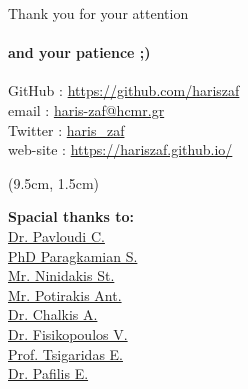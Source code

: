 \documentclass{beamer}
\begin{document}
   \begin{darkframes}
   \begin{frame}{Thank you for your attention}

      \framesubtitle{and your patience ;)}
      GitHub   : \href{https://github.com/hariszaf}{https://github.com/hariszaf} \\
      email    : \href{haris-zaf@hcmr.gr}{haris-zaf@hcmr.gr} \\
      Twitter  : \href{https://twitter.com/haris_zaf}{haris\_zaf} \\
      web-site : \url{https://hariszaf.github.io/} \\
      

      \begin{textblock*}{4.0cm}(9.5cm, 1.5cm)

         \footnotesize \textbf{Spacial thanks to:} \\

         \footnotesize \href{https://cpavloud.github.io/mysite/projects/}{Dr. Pavloudi C.} \\ 
         \footnotesize \href{https://imbbc.hcmr.gr/user/s-paragkamian/}{PhD Paragkamian S.} \\
         \footnotesize \href{https://imbbc.hcmr.gr/user/sninidakis/}{Mr. Ninidakis St.} \\
         \footnotesize \href{https://imbbc.hcmr.gr/user/potant/}{Mr. Potirakis Ant.} \\
         \footnotesize \href{https://tolischal.github.io/}{Dr. Chalkis A.} \\
         \footnotesize \href{https://vissarion.github.io/}{Dr. Fisikopoulos V.} \\ 
         \footnotesize \href{https://who.paris.inria.fr/Elias.Tsigaridas/}{Prof. Tsigaridas E.} \\
         \footnotesize \href{http://lab42open.hcmr.gr/people/evangelospafilis/}{Dr. Pafilis E.} \\
         

\end{textblock*}
\end{frame}
\end{darkframes}
\end{document}
